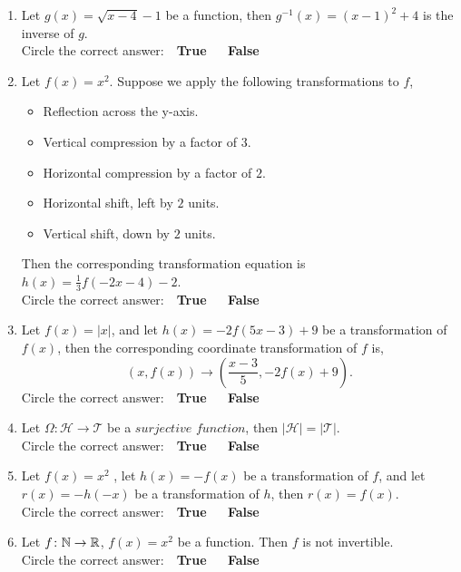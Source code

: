 \documentclass[12pt]{article} %
\begin{document}
\begin{qstn}
\begin{enumerate}
    \item Let $g(x) = \sqrt{x - 4} - 1$ be a function, then $g^{-1}(x) = (x-1)^2 + 4 $ is the inverse of
      $g$.\\
      Circle the correct answer: \,\, \textbf{True} \,\,\,\,\,\, \textbf{False}

    \item Let $f(x) = x^2 $. Suppose we apply the following transformations to $f$,
      \begin{itemize}
        \item Reflection across the y-axis.
        \item Vertical compression by a factor of $3$. 
        \item Horizontal compression by a factor of $2$.
        \item Horizontal shift, left by $2$ units.
        \item Vertical shift, down by $2$ units.
      \end{itemize}
      Then the corresponding transformation equation is $h(x) = \frac{1}{3}f(-2x - 4) - 2$.\\
      Circle the correct answer: \,\, \textbf{True} \,\,\,\,\,\, \textbf{False}

    \newpage

    \item Let $f(x) = \left|x\right|$, and let $h(x) = -2f(5x - 3) + 9$ be a transformation of $f(x)$, then the
      corresponding coordinate transformation of $f$ is,
       \[
           \left( x,f(x) \right)  \longrightarrow \left( \frac{x - 3}{5}, -2f(x) + 9 \right) 
      .\] 
      Circle the correct answer: \,\, \textbf{True} \,\,\,\,\,\, \textbf{False}

    \item Let $\Omega \colon \mathcal{H} \to \mathcal{T}$ be a $\textit{surjective function}$, then $
      \left|\mathcal{H}\right| = \left|\mathcal{T}\right|$.\\
      Circle the correct answer: \,\, \textbf{True} \,\,\,\,\,\, \textbf{False}

    \item Let $f(x) = x^2$ , let $h(x) = -f(x)$ be a transformation of $f$, and let $r(x) = -h(-x)$ be a
      transformation of $h$, then  $r(x) = f(x)$.\\
      Circle the correct answer: \,\, \textbf{True} \,\,\,\,\,\, \textbf{False}

    \item Let $f \colon \mathbb N \to \mathbb R$, $f(x) = x^2$ be a function. Then $f$ is not invertible. \\
      Circle the correct answer: \,\, \textbf{True} \,\,\,\,\,\, \textbf{False}



  \end{enumerate}
\end{qstn}
\end{document}
